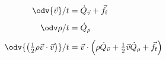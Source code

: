 \begin{subequations}
\begin{align}
  \odv{\vec{v}}/t &= \dot{Q}_{\vec{v}} + \vec{f}_\text{f}
  \\[1ex]
  \odv\rho/t &= \dot{Q}_\rho
  \\[1ex]
  \odv{\left(\tfrac12\rho\vec{v}\cdot\vec{v}\right)}/t &= \vec{v} \cdot \left(
    \rho \dot{Q}_{\vec{v}} + \tfrac12\vec{v}\dot{Q}_\rho + \vec{f}_\text{f}
  \right)
  \label{eq:vdhit_kinetic_energy_with_forcing}
\end{align}
\end{subequations}
